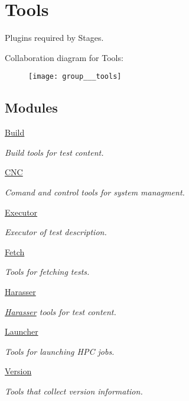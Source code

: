 \hypertarget{group___tools}{\section{Tools}
\label{group___tools}
}


Plugins required by Stages.  


Collaboration diagram for Tools\-:
\nopagebreak
\begin{figure}[H]
\begin{center}
\leavevmode
\texttt{[image: group\_\_\_tools]}
\end{center}
\end{figure}
\subsection*{Modules}
\begin{DoxyCompactItemize}
\item 
\hyperlink{group___build}{Build}
\begin{DoxyCompactList}\small\item\em Build tools for test content. \end{DoxyCompactList}\item 
\hyperlink{group___c_n_c}{C\-N\-C}
\begin{DoxyCompactList}\small\item\em Comand and control tools for system managment. \end{DoxyCompactList}\item 
\hyperlink{group___executor}{Executor}
\begin{DoxyCompactList}\small\item\em Executor of test description. \end{DoxyCompactList}\item 
\hyperlink{group___fetch}{Fetch}
\begin{DoxyCompactList}\small\item\em Tools for fetching tests. \end{DoxyCompactList}\item 
\hyperlink{group___harasser}{Harasser}
\begin{DoxyCompactList}\small\item\em \hyperlink{namespace_harasser}{Harasser} tools for test content. \end{DoxyCompactList}\item 
\hyperlink{group___launcher}{Launcher}
\begin{DoxyCompactList}\small\item\em Tools for launching H\-P\-C jobs. \end{DoxyCompactList}\item 
\hyperlink{group___version}{Version}
\begin{DoxyCompactList}\small\item\em Tools that collect version information. \end{DoxyCompactList}\end{DoxyCompactItemize}
